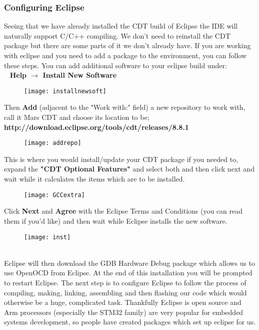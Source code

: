 {{\subsubsection{Configuring Eclipse}
Seeing that we have already installed the CDT build of Eclipse the IDE will naturally support 
C/C++ compiling. We don’t need to reinstall the CDT package but there are some parts of it we don’t already have. If you are working with eclipse and you need to add a package to the environment, you can follow these steps. You can add additional software to your eclipse build under:\\
\-\ \hspace{20pt} \textbf{\color{Green} Help $\rightarrow$ Install New Software}
\begin{figure}[htbp]
\centering
\texttt{[image: installnewsoft]}
\end{figure}
\par
Then \textbf{\color{Purple} Add} (adjacent to the "Work with:" field) a new repository to work with, call it Mars CDT and choose its location to be;\\
\textbf{\color{Orange}http://download.eclipse.org/tools/cdt/releases/8.8.1}\\
\begin{figure}[hbtp]
\centering
\texttt{[image: addrepo]}
\end{figure}
\newpage
\justifying
This is where you would install/update your CDT package if you needed to, expand the \textbf{\color{Purple} "CDT Optional Features"} and select both \underline{} and \underline{} \underline{} then click next and wait while it calculates the items which are to be installed.
\\
\begin{figure}[htbp]
\centering
\texttt{[image: GCCextra]}
\end{figure}
\par
Click \textbf{\color{Purple} Next} and \textbf{\color{Purple} Agree} with the Eclipse Terms and Conditions (you can read them if you'd like) and then wait while Eclipse installs the new software.
\\
\begin{figure}[hbtp]
\centering
\texttt{[image: inst]}
\end{figure}
\\
Eclipse will then download the GDB Hardware Debug package which allows us to use OpenOCD from Eclipse. At the end of this installation you will be prompted to restart Eclipse. The next step is to configure Eclipse to follow the process of compiling, making, linking, assembling and then flashing our code which would otherwise be a huge, complicated task. Thankfully Eclipse is open source and Arm processors (especially the STM32 family) are very popular for embedded systems development, so people have created packages which set up eclipse for us.
}}
